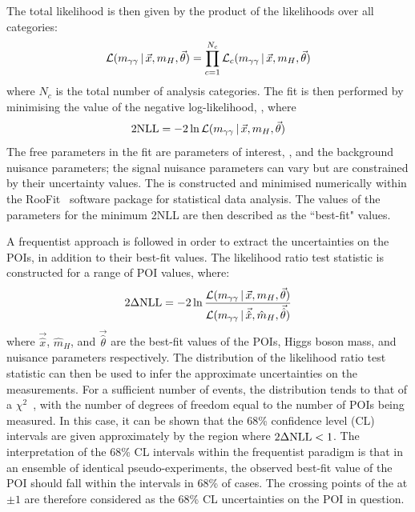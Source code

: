 The total likelihood \Like is then given by the product of the likelihoods over all categories:
\begin{equation}
\mathcal{L}(m_{\gamma\gamma}\,|\,\vec{x},m_{H},\vec{\theta}) = \prod^{N_c}_{c=1} \mathcal{L}_c(m_{\gamma\gamma}\,|\,\vec{x},m_{H},\vec{\theta})
\end{equation}
where $N_c$ is the total number of analysis categories.
The fit is then performed by minimising the value of the negative log-likelihood, \NLL, where
\begin{equation}
2\textrm{NLL} = -2\ln\mathcal{L}(m_{\gamma\gamma}\,|\,\vec{x},m_{H},\vec{\theta})
\end{equation}
The free parameters in the fit are parameters of interest, \mH, and the background nuisance parameters;
the signal nuisance parameters can vary but are constrained by their uncertainty values.
The \NLL is constructed and minimised numerically within the RooFit~\cite{RooFit} 
software package for statistical data analysis.
The values of the parameters for the minimum 2NLL are then described as the ``best-fit" values.

A frequentist approach is followed in order to extract the uncertainties on the POIs, 
in addition to their best-fit values.
The likelihood ratio test statistic is constructed for a range of POI values, where:
\begin{equation}
2\Delta\textrm{NLL} = -2\ln\frac{\mathcal{L}(m_{\gamma\gamma}\,|\,\vec{x},m_{H},\vec{\theta})}{\mathcal{L}(m_{\gamma\gamma}\,|\,\vec{\hat{x}},\hat{m}_H,\vec{\hat{\theta}})}
\end{equation}
where $\vec{\hat{x}}$, $\hat{m}_H$, and $\vec{\hat{\theta}}$ are the best-fit values 
of the POIs, Higgs boson mass, and nuisance parameters respectively.
The distribution of the likelihood ratio test statistic 
can then be used to infer the approximate uncertainties on the measurements.
For a sufficient number of events, %
the distribution tends to that of a $\chi^2$~\cite{Asymptotic}, with the number of degrees of freedom
equal to the number of POIs being measured.
In this case, it can be shown that the 68\% confidence level (CL) intervals 
are given approximately by the region where $2\Delta\textrm{NLL} < 1$.
The interpretation of the 68\% CL intervals within the frequentist paradigm 
is that in an ensemble of identical pseudo-experiments, 
the observed best-fit value of the POI should fall within the intervals in 68\% of cases.
The crossing points of the \dNLL at $\pm 1$ are therefore considered 
as the 68\% CL uncertainties on the POI in question.

